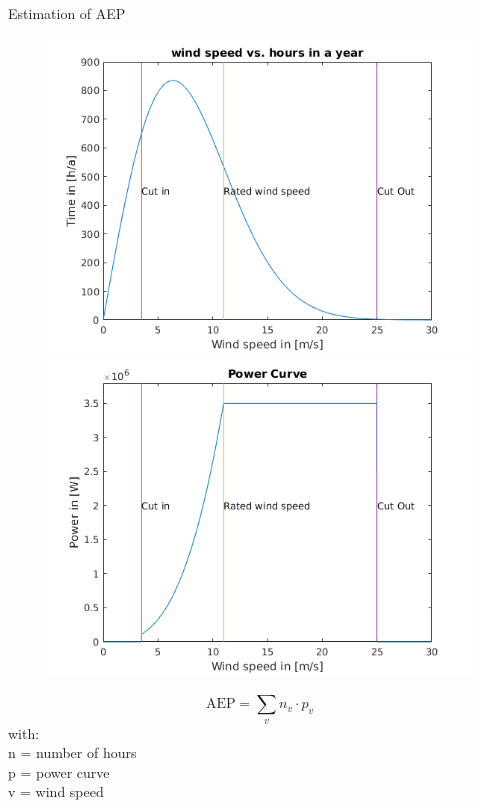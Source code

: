 \documentclass[12pt,t]{beamer}
\begin{document}
\begin{frame}
\huge
Estimation of AEP
\begin{figure}[htbp]
	\begin{center}
		\begin{minipage}[t]{0.4\linewidth}
			\centering
			\includegraphics[width=\linewidth]{figures/ws_plot.png}
		\end{minipage}
		\begin{minipage}[t]{0.4\linewidth}
			\centering
			\includegraphics[width=\linewidth]{figures/power_curve.png}
		\end{minipage}
	\end{center}
\end{figure}
\footnotesize
\begin{equation*}
\text{AEP} = \sum_v n_v \cdot p_v
\end{equation*}
\scriptsize
with: \\
n = number of hours \\
p = power curve\\
v = wind speed\\

\end{frame}
\end{document}
